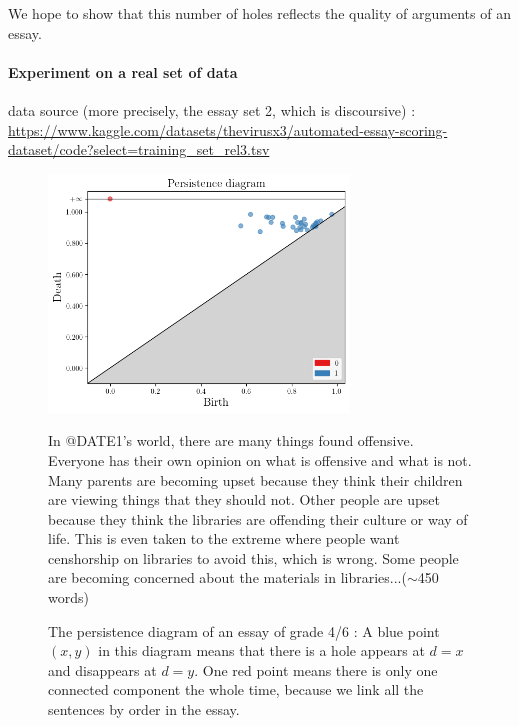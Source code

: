 We hope to show that this number of holes reflects the quality of arguments of an essay.

\paragraph{Experiment on a real set of data}

data source (more precisely, the essay set 2, which is discoursive) :
\url{https://www.kaggle.com/datasets/thevirusx3/automated-essay-scoring-dataset/code?select=training_set_rel3.tsv}

\begin{figure}[H]
\begin{minipage}{0.49\linewidth}
\includegraphics[width=8cm]{pdessay.png}
\end{minipage}
\begin{minipage}{0.49\linewidth}
\begin{mdframed}
In @DATE1's world, there are many things found offensive.  Everyone has their own opinion on what is offensive and what is not. Many parents are becoming upset because they think their children are viewing things that they should not.  Other people are upset because they think the libraries are offending their culture or way of life.  This is even taken to the extreme where people want censhorship on libraries to avoid this, which is wrong.     Some people are becoming concerned about the materials in libraries...($\sim$450 words)
\end{mdframed}
\end{minipage}
\caption{The persistence diagram of an essay of grade 4/6 : A blue point $(x, y)$ in this diagram means
that there is a hole appears at $d=x$ and disappears at $d=y$.
One red point means there is only one connected component the whole time,
because we link all the sentences by order in the essay.
}
\label{fig:pd}
\end{figure}

